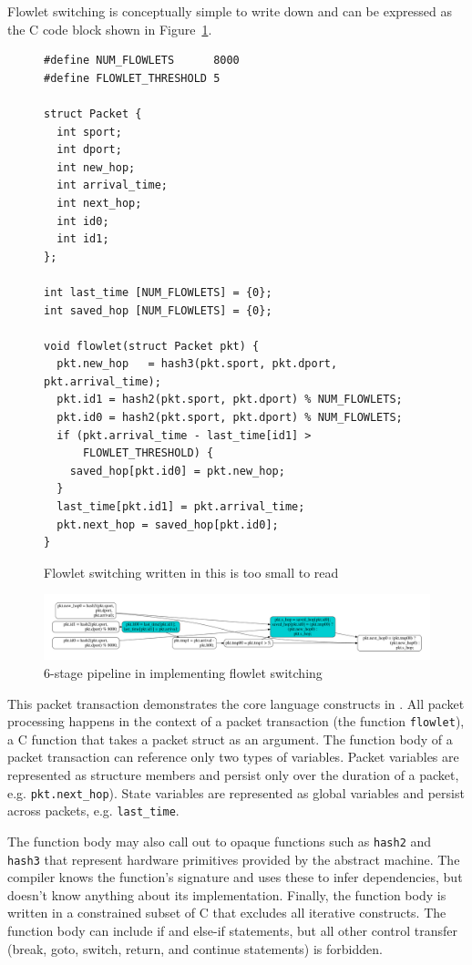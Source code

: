 Flowlet switching is conceptually simple to write down and can be expressed as
the C code block shown in Figure~\ref{fig:flowlet}.
\begin{figure}[!h]
\begin{tiny}
\begin{lstlisting}
#define NUM_FLOWLETS      8000
#define FLOWLET_THRESHOLD 5

struct Packet {
  int sport;
  int dport;
  int new_hop;
  int arrival_time;
  int next_hop;
  int id0;
  int id1;
};

int last_time [NUM_FLOWLETS] = {0};
int saved_hop [NUM_FLOWLETS] = {0};

void flowlet(struct Packet pkt) {
  pkt.new_hop   = hash3(pkt.sport, pkt.dport, pkt.arrival_time);
  pkt.id1 = hash2(pkt.sport, pkt.dport) % NUM_FLOWLETS;
  pkt.id0 = hash2(pkt.sport, pkt.dport) % NUM_FLOWLETS;
  if (pkt.arrival_time - last_time[id1] >
      FLOWLET_THRESHOLD) {
    saved_hop[pkt.id0] = pkt.new_hop;
  }
  last_time[pkt.id1] = pkt.arrival_time;
  pkt.next_hop = saved_hop[pkt.id0];
}
\end{lstlisting}
\end{tiny}
\caption{Flowlet switching written in \pktlanguage \ac{this is too small 
to read}}
\label{fig:flowlet}
\end{figure}

\begin{figure}[!t]
  \includegraphics[width=\textwidth]{pipe.pdf}
  \caption{6-stage pipeline in \absmachine implementing flowlet switching}
  \label{fig:pipeline}
\end{figure}

This packet transaction demonstrates the core language constructs in
\pktlanguage. All packet processing happens in the context of a packet
transaction (the function \texttt{flowlet}), a C function that takes a packet
struct as an argument. The function body of a packet transaction can reference
only two types of variables. Packet variables are represented as structure
members and persist only over the duration of a packet, e.g.
\texttt{pkt.next\_hop}). State variables are represented as global variables
and persist across packets, e.g. \texttt{last\_time}.

The function body may also call out to opaque functions such as \texttt{hash2}
and \texttt{hash3} that represent hardware primitives provided by the abstract
machine. The \pktlanguage compiler knows the function's signature and uses
these to infer dependencies, but doesn't know anything about its
implementation. Finally, the function body is written in a constrained subset
of C that excludes all iterative constructs. The function body can include if
and else-if statements, but all other control transfer (break, goto, switch,
return, and continue statements) is forbidden.

